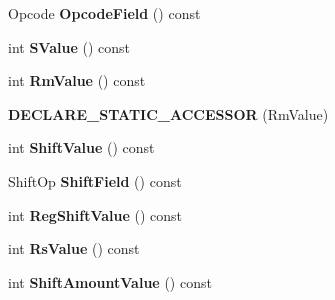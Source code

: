 \begin{DoxyCompactItemize}
\item 
Opcode {\bfseries Opcode\+Field} () const \hypertarget{classv8_1_1internal_1_1_instruction_a6af76da02c385681e21650723c152768}{}\label{classv8_1_1internal_1_1_instruction_a6af76da02c385681e21650723c152768}

\item 
int {\bfseries S\+Value} () const \hypertarget{classv8_1_1internal_1_1_instruction_a18fa70e042ccf4db8587aa5a1a2a508c}{}\label{classv8_1_1internal_1_1_instruction_a18fa70e042ccf4db8587aa5a1a2a508c}

\item 
int {\bfseries Rm\+Value} () const \hypertarget{classv8_1_1internal_1_1_instruction_a38a3796a09bbbd4ad9e8a3e27bef4be3}{}\label{classv8_1_1internal_1_1_instruction_a38a3796a09bbbd4ad9e8a3e27bef4be3}

\item 
{\bfseries D\+E\+C\+L\+A\+R\+E\+\_\+\+S\+T\+A\+T\+I\+C\+\_\+\+A\+C\+C\+E\+S\+S\+OR} (Rm\+Value)\hypertarget{classv8_1_1internal_1_1_instruction_ab35d6f038fba9a5a1d8e9c17f98db53a}{}\label{classv8_1_1internal_1_1_instruction_ab35d6f038fba9a5a1d8e9c17f98db53a}

\item 
int {\bfseries Shift\+Value} () const \hypertarget{classv8_1_1internal_1_1_instruction_a03a46b27a04797b3b9f233bf6bd06819}{}\label{classv8_1_1internal_1_1_instruction_a03a46b27a04797b3b9f233bf6bd06819}

\item 
Shift\+Op {\bfseries Shift\+Field} () const \hypertarget{classv8_1_1internal_1_1_instruction_a8ce75d5bc97a7eb772cedd1793763566}{}\label{classv8_1_1internal_1_1_instruction_a8ce75d5bc97a7eb772cedd1793763566}

\item 
int {\bfseries Reg\+Shift\+Value} () const \hypertarget{classv8_1_1internal_1_1_instruction_aecbfc046f0bb24242c7151fe18bb4f36}{}\label{classv8_1_1internal_1_1_instruction_aecbfc046f0bb24242c7151fe18bb4f36}

\item 
int {\bfseries Rs\+Value} () const \hypertarget{classv8_1_1internal_1_1_instruction_af70e23d79e84eab8749f9f55005f4932}{}\label{classv8_1_1internal_1_1_instruction_af70e23d79e84eab8749f9f55005f4932}

\item 
int {\bfseries Shift\+Amount\+Value} () const \hypertarget{classv8_1_1internal_1_1_instruction_ad5fdb01cbc3337a59fc812df8009d249}{}\label{classv8_1_1internal_1_1_instruction_ad5fdb01cbc3337a59fc812df8009d249}


\end{DoxyCompactItemize}

